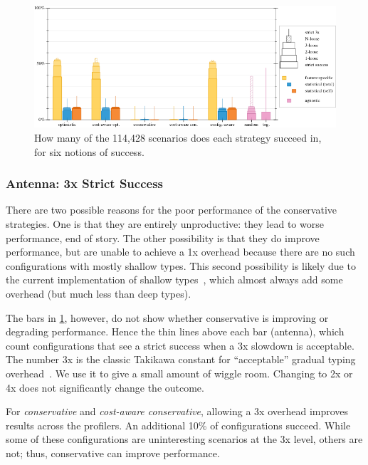 \begin{figure}[t]
  \includegraphics[width=\columnwidth]{data/strategy-overall-feasible.pdf}
  \caption{How many of the 114,428 scenarios does each strategy succeed in, for six notions of success.}
  \label{f:strategy-overall}
\end{figure}

\subsubsection{Antenna: 3x Strict Success}
\label{s:antenna}

There are two possible reasons for the poor performance of the conservative
strategies.
One is that they are entirely unproductive: they lead to worse performance, end
of story.
The other possibility is that they do improve performance, but are unable
to achieve a 1x overhead because there are no such configurations with
mostly shallow types.
This second possibility is likely due to the current implementation of shallow
types~\cite{g-deep-shallow}, which almost always add some overhead (but much
less than deep types).

The bars in \cref{f:strategy-overall}, however, do not show whether conservative
is improving or degrading performance.
Hence the thin lines above each bar (antenna), which count configurations that see
a strict success when a 3x slowdown is acceptable.
The number 3x is the classic Takikawa constant for ``acceptable'' gradual typing
overhead~\cite{tfgnvf-popl-2016,vss-popl-2017,bbst-oopsla-2017}.
We use it to give a small amount of wiggle room.
Changing to 2x or 4x does not significantly change the outcome.

For \emph{conservative} and \emph{cost-aware conservative}, allowing a 3x overhead
improves results across the profilers.
An additional 10\% of configurations succeed.
While some of these configurations are uninteresting scenarios at the 3x level,
others are not; thus, conservative can improve performance.

